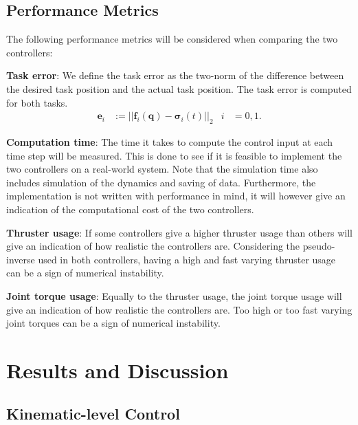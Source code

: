 \subsection{Performance Metrics}
The following performance metrics will be considered when comparing the two controllers:

\textbf{Task error}: We define the task error as the two-norm of the difference
between the desired task position and the actual task position. The task error
is computed for both tasks.
\begin{align}
    \bm{e}_i &:= ||\bm{f}_i(\bm{q}) - \bm{\sigma}_i(t)||_2 &
        i &= 0, 1.
\end{align}

\textbf{Computation time}: The time it takes to compute the control input at each
time step will be measured. This is done to see if it is feasible to implement the
two controllers on a real-world system. Note that the simulation time also includes
simulation of the dynamics and saving of data. Furthermore, the implementation is
not written with performance in mind, it will however give an indication of the
computational cost of the two controllers.

\textbf{Thruster usage}: If some controllers give a higher thruster usage than others
will give an indication of how realistic the controllers are. Considering the
pseudo-inverse used in both controllers, having a high and fast varying thruster
usage can be a sign of numerical instability.

\textbf{Joint torque usage}: Equally to the thruster usage, the joint torque usage
will give an indication of how realistic the controllers are. Too high or too
fast varying joint torques can be a sign of numerical instability.


\newpage
\section{Results and Discussion}
\label{sec:simulation:results}

\subsection{Kinematic-level Control}

